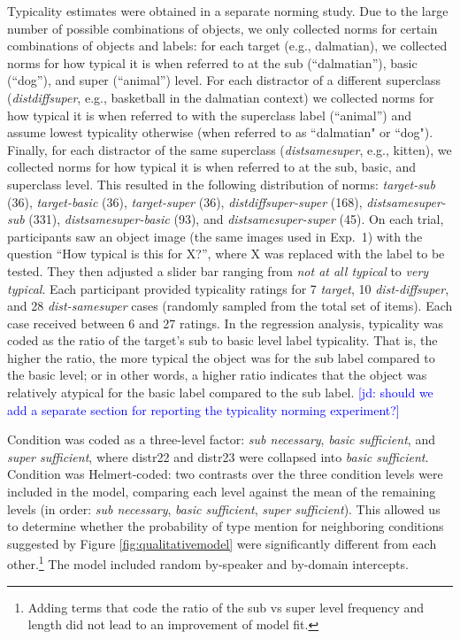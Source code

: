 \documentclass[10pt,letterpaper]{article}
\newcommand{\jd}[1]{\textcolor{Blue}{[jd: #1]}}
\newcommand{\figref}[1]{Figure \ref{#1}}
\begin{document}
Typicality estimates were obtained in a separate norming study. Due to the large number of possible combinations of objects, we only collected norms for certain combinations of objects and labels: for each target (e.g., dalmatian), we collected norms for how typical it is when referred to at the sub (``dalmatian''), basic (``dog''), and super (``animal'') level. For each distractor of a different superclass (\emph{distdiffsuper}, e.g., basketball in the dalmatian context) we collected norms for how typical it is when referred to with the superclass label (``animal'') and assume lowest typicality otherwise (when referred to as ``dalmatian" or ``dog"). Finally, for each distractor of the same superclass (\emph{distsamesuper}, e.g., kitten), we collected norms for how typical it is when referred to at the sub, basic, and superclass level. This resulted in the following distribution of norms:  \emph{target-sub} (36), \emph{target-basic} (36), \emph{target-super} (36), \emph{distdiffsuper-super} (168), \emph{distsamesuper-sub} (331), \emph{distsamesuper-basic} (93), and \emph{distsamesuper-super} (45). On each trial, participants saw an object image (the same images used in Exp.~1) with the question ``How typical is this for X?'', where X was replaced with the label to be tested. They then adjusted a slider bar ranging from \emph{not at all typical} to \emph{very typical}. Each participant provided typicality ratings for 7 \emph{target}, 10 \emph{dist-diffsuper}, and 28 \emph{dist-samesuper} cases (randomly sampled from the total set of items). Each case received between 6 and 27 ratings. In the regression analysis, typicality was coded as the ratio of the target's sub to basic level label typicality. That is, the higher the ratio, the more typical the object was for the sub label compared to the basic level; or in other words, a higher ratio indicates that the object was relatively atypical for the basic label compared to the sub label. \jd{should we add a separate section for reporting the typicality norming experiment?}

Condition was coded as a three-level factor: \emph{sub necessary}, \emph{basic sufficient}, and \emph{super sufficient}, where distr22 and distr23 were collapsed into \emph{basic sufficient}. Condition was Helmert-coded: two contrasts over the three condition levels were included in the model, comparing each level against the mean of the remaining levels (in order: \emph{sub necessary}, \emph{basic sufficient}, \emph{super sufficient}). This allowed us to determine whether the probability of type mention  for neighboring conditions suggested by \figref{fig:qualitativemodel} were significantly different from each other.\footnote{Adding terms that code the ratio of the sub vs super level frequency and length did not lead to an improvement of model fit.} The model included random by-speaker and by-domain intercepts. 
\end{document}
